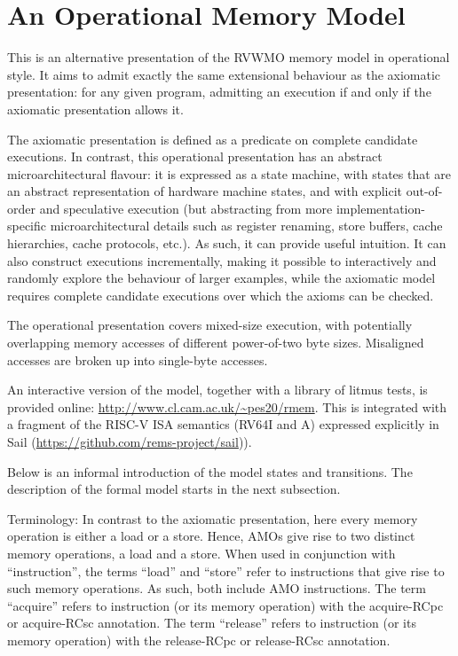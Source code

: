 \section{An Operational Memory Model}
\label{sec:operational}
This is an alternative presentation of the RVWMO memory model in
operational style.
%
It aims to admit exactly the same extensional behaviour as the
axiomatic presentation: for any given program, admitting an execution
if and only if the axiomatic presentation allows it.

The axiomatic presentation is defined as a predicate on complete
candidate executions.  In contrast, this operational presentation has
an abstract microarchitectural flavour: it is expressed as a state
machine, with states that are an abstract representation of hardware
machine states, and with explicit out-of-order and speculative
execution
(but abstracting from more implementation-specific microarchitectural
details such as register renaming, store buffers, cache hierarchies, cache protocols, etc.).
As such, it can provide useful intuition.
It can also
construct executions incrementally, making it possible to
interactively and randomly explore the behaviour of larger examples,
while the axiomatic model requires complete candidate executions
over which the axioms can be checked.

The operational presentation covers mixed-size execution, with
potentially overlapping memory accesses of different power-of-two byte
sizes.  Misaligned accesses are broken up into single-byte accesses.

An interactive version of the model, together with a library of litmus tests,
is provided online: \url{http://www.cl.cam.ac.uk/~pes20/rmem}.
This is integrated with a fragment of the RISC-V ISA semantics
(RV64I and A) expressed explicitly in Sail
(\url{https://github.com/rems-project/sail})).


Below is an informal introduction of the model states and transitions.
The description of the formal model starts in the next subsection.


Terminology: In contrast to the axiomatic presentation, here every memory operation is either a load or a store.
Hence, AMOs give rise to two distinct memory operations, a load and a store.
When used in conjunction with ``instruction'', the terms ``load'' and ``store'' refer to instructions that give rise to such memory operations.
As such, both include AMO instructions.
The term ``acquire'' refers to instruction (or its memory operation) with the acquire-RCpc or acquire-RCsc annotation.
The term ``release'' refers to instruction (or its memory operation) with the release-RCpc or release-RCsc annotation.


